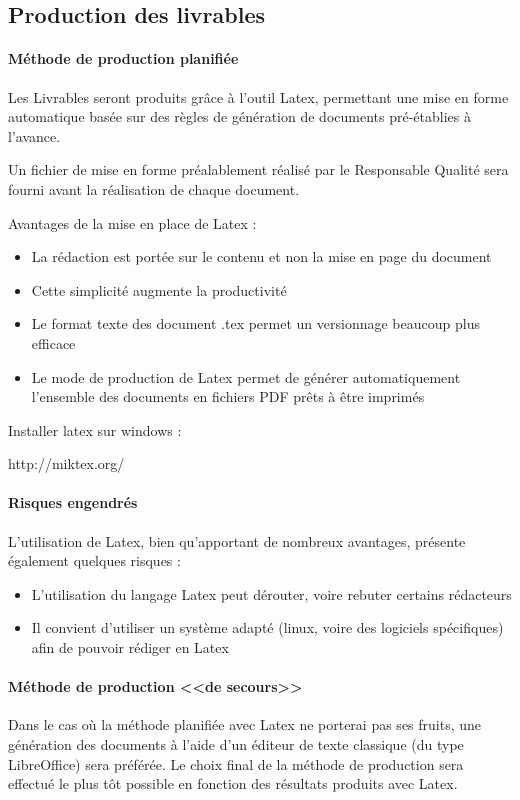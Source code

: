 \documentclass{mise_en_page}
\begin{document}
\subsection{Production des livrables}
\paragraph{Méthode de production planifiée}
Les Livrables seront produits grâce à l’outil Latex, permettant une mise
en forme automatique basée sur des règles de génération de documents
pré-établies à l’avance.




Un fichier de mise en forme préalablement réalisé par le Responsable
Qualité sera fourni avant la réalisation de chaque document.




Avantages de la mise en place de Latex :

\begin{itemize}
\item La rédaction est portée sur le contenu et non la mise en page du
document
\item Cette simplicité augmente la productivité
\item Le format texte des document .tex permet un versionnage beaucoup
plus efficace
\item Le mode de production de Latex permet de générer automatiquement
l’ensemble des documents en fichiers PDF prêts à être imprimés
\end{itemize}



Installer latex sur windows :

http://miktex.org/

\paragraph{Risques engendrés}
L’utilisation de Latex, bien qu’apportant de nombreux avantages,
présente également quelques risques :

\begin{itemize}
\item L’utilisation du langage Latex peut dérouter, voire rebuter
certains rédacteurs
\item Il convient d’utiliser un système adapté (linux, voire des
logiciels spécifiques) afin de pouvoir rédiger en Latex
\end{itemize}
\paragraph{Méthode de
production <<de secours>>}
Dans le cas où la méthode planifiée avec Latex ne porterai pas ses
fruits, une génération des documents à l’aide d’un éditeur de texte
classique (du type LibreOffice) sera préférée. Le choix final de la
méthode de production sera effectué le plus tôt possible en fonction
des résultats produits avec Latex.
\end{document}
